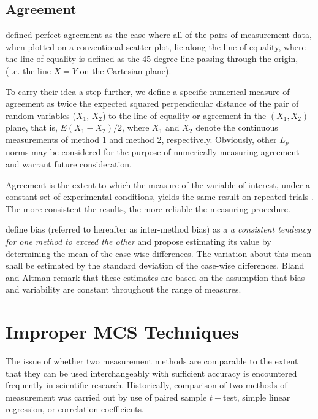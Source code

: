 \documentclass[12pt, a4paper]{report}
\theoremstyle{plain}
\theoremstyle{definition}
\theoremstyle{remark}
\begin{document}
	
	
	\subsection{Agreement}
	\citet{BA86} defined perfect agreement as the case where all of the pairs of measurement data, when plotted on a conventional scatter-plot, lie along the line of equality, where the line of equality is defined as the 45 degree line passing through the origin, (i.e. the line $X=Y$ on the Cartesian plane). 
	
	To carry their idea a step further, we define a specific numerical measure of agreement as twice the expected squared perpendicular distance of the pair of random variables ($X_1$, $X_2$) to the line of equality or agreement in the $(X_1,X_2)$-plane, that is, $E(X_1 - X_2)/2$, where $X_1$ and $X_2$ denote the continuous measurements of method 1 and method 2, respectively. Obviously, other $L_p$ norms may be considered for the purpose of numerically measuring agreement and warrant future consideration. 
	
	
	Agreement is the extent to which the measure of the variable of interest, under a constant set of experimental conditions, yields the same result on repeated trials \citep{sanchez1999}. The more consistent the results, the more reliable the measuring procedure.
	
	
	
	
	
\citet{BA83} define bias (referred to hereafter as inter-method bias) as a \emph{a consistent tendency for one method to exceed the other} and propose estimating its value by determining the mean of the case-wise differences. 
	The variation about this mean shall be estimated by the  standard deviation of the case-wise differences. Bland and Altman remark that these estimates are based on the assumption that bias and variability are constant throughout the
	range of measures.
	
	
	
	
	
	
	\section{Improper MCS Techniques}
The issue of whether two measurement methods are comparable to the extent that they can be used interchangeably with sufficient accuracy is encountered frequently in scientific research. Historically, comparison of two methods of measurement was carried
	out by use of paired sample $t-$test, 
	simple linear regression, or correlation coefficients. 
	
\end{document}
